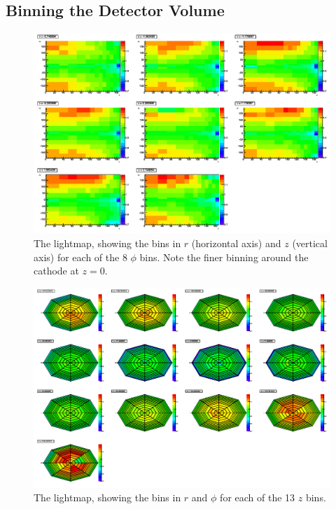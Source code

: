 \documentclass[herrin-thesis.tex]{subfiles}
\begin{document}
\subsection{Binning the Detector Volume}

\begin{figure}[tbhp]
\centering
\includegraphics[width=\textwidth]{./plots/lightmap_binned_phi_slices.pdf}
\caption[Lightmap \(\phi\) slices]{The lightmap, showing the bins in \(r\) (horizontal axis) and \(z\) (vertical axis) for each of the 8 \(\phi\) bins. Note the finer binning around the cathode at \(z=0\).}
\label{fig:lightmap_binned_phi_slices}
\end{figure}
\begin{figure}[tbhp]
\centering
\includegraphics[width=\textwidth]{./plots/lightmap_binned_z_slices.pdf}
\caption[Lightmap \(z\) slices]{The lightmap, showing the bins in \(r\) and \(\phi\) for each of the 13 \(z\) bins.}
\label{fig:lightmap_binned_z_slices}
\end{figure}
\end{document}
